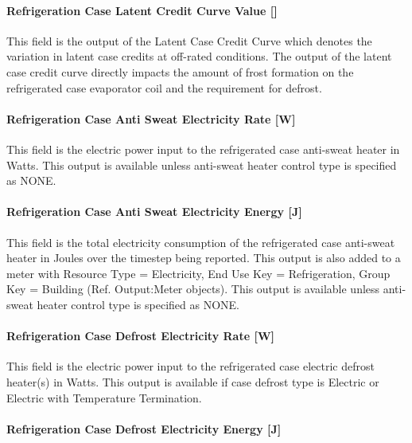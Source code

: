 \paragraph{Refrigeration Case Latent Credit Curve Value {[]}}\label{refrigeration-case-latent-credit-curve-value}

This field is the output of the Latent Case Credit Curve which denotes the variation in latent case credits at off-rated conditions. The output of the latent case credit curve directly impacts the amount of frost formation on the refrigerated case evaporator coil and the requirement for defrost.

\paragraph{Refrigeration Case Anti Sweat Electricity Rate {[}W{]}}\label{refrigeration-case-anti-sweat-electric-power-w}

This field is the electric power input to the refrigerated case anti-sweat heater in Watts. This output is available unless anti-sweat heater control type is specified as NONE.

\paragraph{Refrigeration Case Anti Sweat Electricity Energy {[}J{]}}\label{refrigeration-case-anti-sweat-electric-energy-j}

This field is the total electricity consumption of the refrigerated case anti-sweat heater in Joules over the timestep being reported. This output is also added to a meter with Resource Type = Electricity, End Use Key = Refrigeration, Group Key = Building (Ref. Output:Meter objects). This output is available unless anti-sweat heater control type is specified as NONE.

\paragraph{Refrigeration Case Defrost Electricity Rate {[}W{]}}\label{refrigeration-case-defrost-electric-power-w}

This field is the electric power input to the refrigerated case electric defrost heater(s) in Watts. This output is available if case defrost type is Electric or Electric with Temperature Termination.

\paragraph{Refrigeration Case Defrost Electricity Energy {[}J{]}}\label{refrigeration-case-defrost-electric-energy-j}


